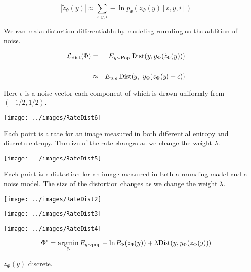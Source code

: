{\vfill
{\color{red} $$|\tilde{z}_\Phi(y)| \approx \sum_{x,y,i} -\ln p_\Phi(z_\Phi(y)[x,y,i])$$}


We can make distortion differentiable by modeling rounding as the addition of noise.

\begin{eqnarray*}
{\cal L}_{\mathrm{dist}}(\Phi) & = & E_{y \sim \mathrm{Pop}} \;\mathrm{Dist}(y,y_\Phi(\tilde{z}_\Phi(y))) \\
\\
& \approx & E_{y,\epsilon} \;\mathrm{Dist}(y,\;y_\Phi(z_\Phi(y) + \epsilon))
\end{eqnarray*}

\vfill
Here $\epsilon$ is a noise vector each component of which is drawn uniformly from $(-1/2,1/2)$.


\bigskip
\centerline{\texttt{[image: ../images/RateDist6]}}

Each point is a rate for an image measured in both differential entropy and discrete entropy.  The size of the rate changes as we change the weight $\lambda$.


\centerline{\texttt{[image: ../images/RateDist5]}}

Each point is a distortion for an image measured in both a rounding model and a noise model.  The size of the distortion changes as we change the weight $\lambda$.


\bigskip
\centerline{\texttt{[image: ../images/RateDist2]}}


\bigskip
\centerline{\texttt{[image: ../images/RateDist3]}}


\bigskip
\centerline{\texttt{[image: ../images/RateDist4]}}



$$\Phi^* = \operatorname*{argmin}_\Phi E_{y \sim \mathrm{pop}} - \ln P_\Phi(z_\Phi(y)) + \lambda \mathrm{Dist}(y,y_\Phi(z_\Phi(y)))$$

\vfill
$z_\Phi(y)$ discrete.


}

